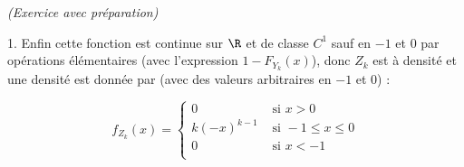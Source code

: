 \documentclass[11pt]{article}%
\begin{document}
\begin{exercice}{\it (Exercice avec préparation)}
\begin{noliste}{1.}
 Enfin cette fonction est continue sur $\R$ et de classe $C^{1}$ sauf
en $-1$ et 0 par opérations élémentaires (avec l'expression $ 1 - F_{
Y_{k} } (x)$), donc $Z_{k}$ est à densité et une densité est donnée par
(avec des valeurs arbitraires en $-1$ et 0) : 
 
\[
 f_{ Z_{k} } (x) = \left\{ 
\begin{array}{cl}
 0 & \text{ si } x > 0 \\
k (-x)^{k-1} & \text{ si } -1 \leq x \leq 0 \\
0 & \text{ si } x < - 1 \\
\end{array}
\right. 
\]

 \end{noliste}
 \end{exercice}

 \newpage
\end{document}
